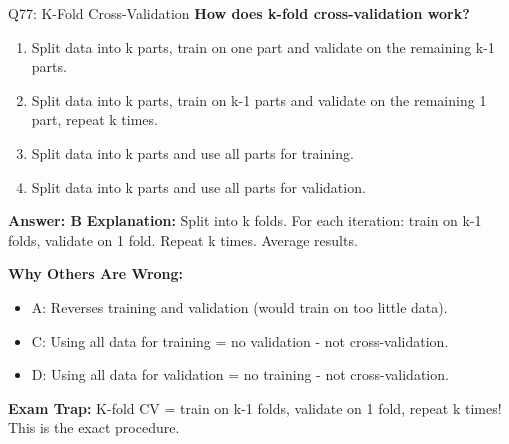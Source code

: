 \documentclass[8pt]{beamer}
\begin{document}
	\begin{frame}{Q77: K-Fold Cross-Validation}
		\fontsize{6.5}{7.5}\selectfont
		\textbf{How does k-fold cross-validation work?}
		
		\begin{enumerate}
			\item Split data into k parts, train on one part and validate on the remaining k-1 parts.
			\item Split data into k parts, train on k-1 parts and validate on the remaining 1 part, repeat k times.
			\item Split data into k parts and use all parts for training.
			\item Split data into k parts and use all parts for validation.
		\end{enumerate}
		
		\vspace{0.05cm}
		\textcolor{myblue}{\textbf{Answer: B}}
		\vspace{0.05cm}
		\textcolor{myblue}{\textbf{Explanation:}} Split into k folds. For each iteration: train on k-1 folds, validate on 1 fold. Repeat k times. Average results.
		
		\vspace{0.05cm}
		\textcolor{myred}{\textbf{Why Others Are Wrong:}}
		\begin{itemize}
			\item \textcolor{myred}{A:} Reverses training and validation (would train on too little data).
			\item \textcolor{myred}{C:} Using all data for training = no validation - not cross-validation.
			\item \textcolor{myred}{D:} Using all data for validation = no training - not cross-validation.
		\end{itemize}
		
		\textcolor{myred}{\textbf{Exam Trap:}} K-fold CV = train on \textcolor{myblue}{k-1 folds}, validate on \textcolor{myblue}{1 fold}, repeat k times! This is the exact procedure.
	\end{frame}
	
\end{document}
